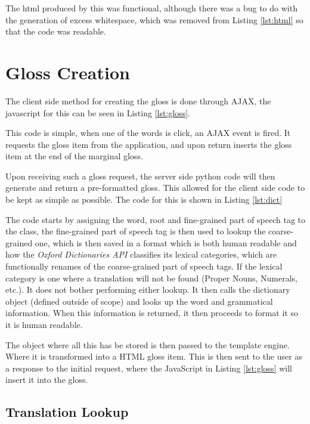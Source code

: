 \small{}

The html produced by this was functional, although there was a bug to do with the generation of excess whitespace, which was removed from Listing \ref{lst:html} so that the code was readable. 

\section{Gloss Creation}

The client side method for creating the gloss is done through AJAX, the javascript for this can be seen in Listing \ref{lst:gloss}.



This code is simple, when one of the words is click, an AJAX event is fired. It requests the gloss item from the application, and upon return inserts the gloss item at the end of the marginal gloss.

Upon receiving such a gloss request, the server side python code will then generate and return a pre-formatted gloss. This allowed for the client side code to be kept as simple as possible. The code for this is shown in Listing \ref{lst:dict}



The code starts by assigning the word, root and fine-grained part of speech tag to the class, the fine-grained part of speech tag is then used to lookup the coarse-grained one, which is then saved in a format which is both human readable and how the \textit{Oxford Dictionaries API} classifies its lexical categories, which are functionally renames of the coarse-grained part of speech tags.  If the lexical category is one where a translation will not be found (Proper Nouns, Numerals, etc.). It does not bother performing either lookup. It then calls the dictionary object (defined outside of scope) and looks up the word and grammatical information. When this information is returned, it then proceeds to format it so it is human readable.

The object where all this has be stored is then passed to the template engine. Where it is transformed into a HTML gloss item. This is then sent to the user as a response to the initial request, where the JavaScript in Listing \ref{lst:gloss} will insert it into the gloss. 

\subsection{Translation Lookup}

